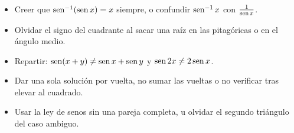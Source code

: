 \documentclass[11pt,a4paper]{article}
\begin{document}
\begin{ojo}
\begin{itemize}
\item Creer que $\operatorname{sen}^{-1}(\operatorname{sen} x)=x$ siempre, o confundir $\operatorname{sen}^{-1}x$ con $\frac{1}{\operatorname{sen} x}$.
\item Olvidar el signo del cuadrante al sacar una raíz en las pitagóricas o en el ángulo medio.
\item Repartir: $\operatorname{sen}(x+y)\neq\operatorname{sen} x+\operatorname{sen} y$ y $\operatorname{sen}2x\neq2\operatorname{sen} x$.
\item Dar una sola solución por vuelta, no sumar las vueltas o no verificar tras elevar al cuadrado.
\item Usar la ley de senos sin una pareja completa, u olvidar el segundo triángulo del caso ambiguo.
\end{itemize}
\end{ojo}
\end{document}

